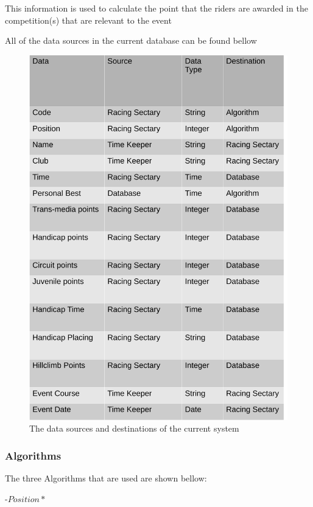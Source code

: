 This information is used to calculate the point that the riders are awarded in the competition(s) that are relevant to the event

All of the data sources in the current database can be found bellow

\begin{figure}[H]
    \includegraphics[width=\textwidth]{./DataSources.pdf}
    \caption{The data sources and destinations of the current system} \label{fig:Data_Sources}
\end{figure}



\subsubsection{Algorithms}
The three Algorithms that are used are shown bellow:

\begin{algorithm}[H]
\label{fig:Ride Time Algorithm}
	\caption{$Ride Time Algorithum$}
\begin{algorithmic}[1]
-{$Position*$}
\end{algorithmic}
\end{algorithm}


